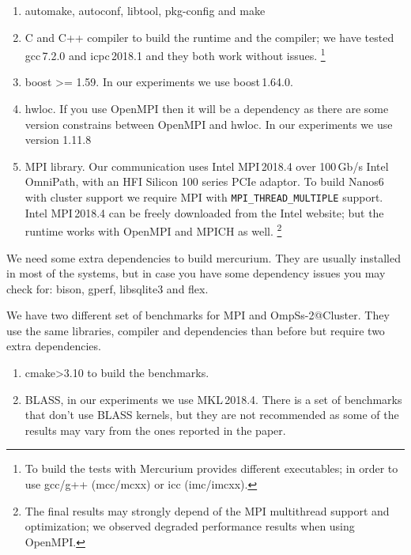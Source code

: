 \documentclass{article}
\newcommand{\code}[1]{\texttt{#1}}
\begin{document}
\begin{enumerate}
    \item automake, autoconf, libtool, pkg-config and make

    \item C and C++ compiler to build the runtime and the compiler; we have
        tested gcc\,7.2.0 and icpc\,2018.1 and they both work without issues.
        \footnote{To build the tests with Mercurium provides different executables;
        in order to use gcc/g++ (mcc/mcxx) or icc (imc/imcxx).}

    \item boost >= 1.59. In our experiments we use boost\,1.64.0.

    \item hwloc. If you use OpenMPI then it will be a dependency as there are some
        version constrains between OpenMPI and hwloc. In our experiments we use
        version 1.11.8

    \item MPI library. Our communication uses Intel MPI\,2018.4 over 100\,Gb/s Intel
        OmniPath, with an HFI Silicon 100 series PCIe adaptor. To build Nanos6
        with cluster support we require MPI with
        \code{MPI\_THREAD\_MULTIPLE} support.  Intel MPI\,2018.4 can be freely
        downloaded from the Intel website; but the runtime works with OpenMPI
        and MPICH as well. \footnote{The final results may strongly depend of
        the MPI multithread support and optimization; we observed degraded
        performance results when using OpenMPI.}
\end{enumerate}

We need some extra dependencies to build mercurium. They are usually
installed in most of the systems, but in case you have some dependency
issues you may check for: bison, gperf, libsqlite3 and flex.

We have two different set of benchmarks for MPI and
OmpSs-2@Cluster. They use the same libraries, compiler and
dependencies than before but require two extra dependencies.

\begin{enumerate}
    \item cmake>3.10 to build the benchmarks.
    \item BLASS, in our experiments we use MKL\,2018.4. There is a set of benchmarks
        that don't use BLASS kernels, but they are not recommended as some of the
        results may vary from the ones reported in the paper.
\end{enumerate}
\end{document}
